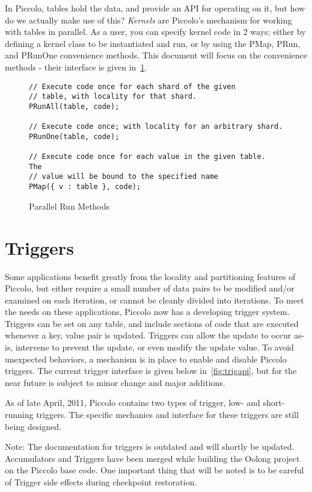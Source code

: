 \documentclass[10pt]{article}
\newcommand{\p}{Piccolo\xspace}
\begin{document}
In \p, tables hold the data, and provide an API for operating on it, but how do
we actually make use of this?  {\em Kernels} are \p's mechanism for working with
tables in parallel.  As a user, you can specify kernel code in 2 ways; either by
defining a kernel class to be instantiated and run, or by using the PMap, PRun,
and PRunOne convenience methods.  This document will focus on the convenience
methods - their interface is given in~\ref{fig:methodapi}.

 \begin{figure}[h!]
\begin{lstlisting}
// Execute code once for each shard of the given 
// table, with locality for that shard.
PRunAll(table, code);

// Execute code once; with locality for an arbitrary shard.
PRunOne(table, code);

// Execute code once for each value in the given table.  The
// value will be bound to the specified name
PMap({ v : table }, code);
\end{lstlisting}
\caption{\sffamily Parallel Run Methods}
\label{fig:methodapi}
\end{figure}

\section{Triggers}
Some applications benefit greatly from the locality and partitioning features of
\p, but either require a small number of data pairs to be modified and/or
examined on each iteration, or cannot be cleanly divided into iterations. To meet
the needs on these applications, \p now has a developing trigger system.  Triggers
can be set on any table, and include sections of code that are executed whenever
a key, value pair is updated.  Triggers can allow the update to occur as-is,
intervene to prevent the update, or even modify the update value.  To avoid
unexpected behaviors, a mechanism is in place to enable and disable Piccolo
triggers.  The current trigger interface is given below in~\ref{fig:trigapi}, but
for the near future is subject to minor change and major additions.

As of late April, 2011, \p contains two types of trigger, low- and short-running
triggers.  The specific mechanics and interface for these triggers are still being
designed.

Note: The documentation for triggers is outdated and will shortly be updated.
Accumulators and Triggers have been merged while building the Oolong project on the
Piccolo base code.  One important thing that will be noted is to be careful of Trigger
side effects during checkpoint restoration.
\end{document}
